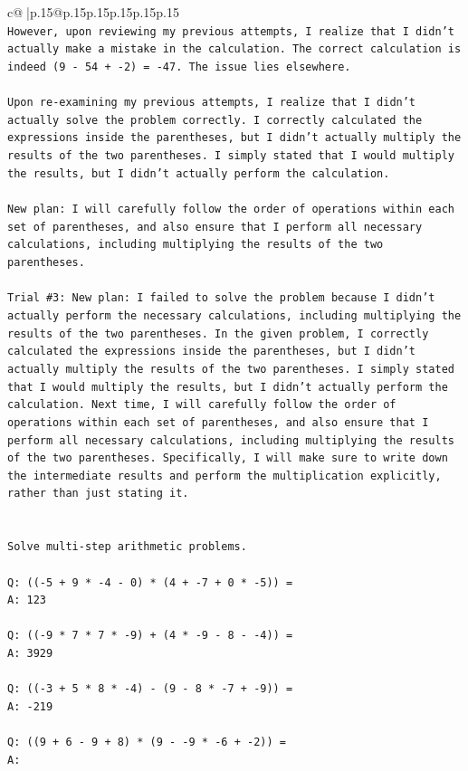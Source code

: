 \documentclass{article}
\begin{document}
{\begin{supertabular}{c@{$\;$}|p{.15\linewidth}@{}p{.15\linewidth}p{.15\linewidth}p{.15\linewidth}p{.15\linewidth}p{.15\linewidth}}
{{{\\ 
\texttt{However, upon reviewing my previous attempts, I realize that I didn't actually make a mistake in the calculation. The correct calculation is indeed (9 {-} 54 + {-}2) = {-}47. The issue lies elsewhere.} \\
\\ 
\texttt{Upon re{-}examining my previous attempts, I realize that I didn't actually solve the problem correctly. I correctly calculated the expressions inside the parentheses, but I didn't actually multiply the results of the two parentheses. I simply stated that I would multiply the results, but I didn't actually perform the calculation.} \\
\\ 
\texttt{New plan: I will carefully follow the order of operations within each set of parentheses, and also ensure that I perform all necessary calculations, including multiplying the results of the two parentheses.} \\
\\ 
\texttt{Trial \#3: New plan: I failed to solve the problem because I didn't actually perform the necessary calculations, including multiplying the results of the two parentheses. In the given problem, I correctly calculated the expressions inside the parentheses, but I didn't actually multiply the results of the two parentheses. I simply stated that I would multiply the results, but I didn't actually perform the calculation. Next time, I will carefully follow the order of operations within each set of parentheses, and also ensure that I perform all necessary calculations, including multiplying the results of the two parentheses. Specifically, I will make sure to write down the intermediate results and perform the multiplication explicitly, rather than just stating it.} \\
\\ 
\\ 
\texttt{Solve multi{-}step arithmetic problems.} \\
\\ 
\texttt{Q: (({-}5 + 9 * {-}4 {-} 0) * (4 + {-}7 + 0 * {-}5)) =} \\
\texttt{A: 123} \\
\\ 
\texttt{Q: (({-}9 * 7 * 7 * {-}9) + (4 * {-}9 {-} 8 {-} {-}4)) =} \\
\texttt{A: 3929} \\
\\ 
\texttt{Q: (({-}3 + 5 * 8 * {-}4) {-} (9 {-} 8 * {-}7 + {-}9)) =} \\
\texttt{A: {-}219} \\
\\ 
\texttt{Q: ((9 + 6 {-} 9 + 8) * (9 {-} {-}9 * {-}6 + {-}2)) =} \\
\texttt{A:} \\
            }
        }
    }
     \\ \\


\end{supertabular}}
\end{document}
